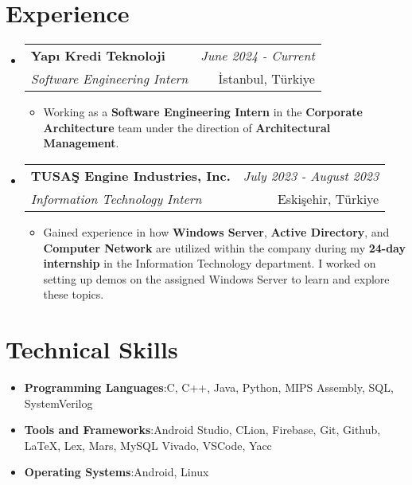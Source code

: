 \documentclass[a4paper,11pt]{article}
\makeatletter
\newcommand{\resumeItem}[2]{
    \item{\textbf{#1}{:\hspace{0.5mm}#2 \vspace{-0.5mm}}}
}
\newcommand{\resumeProject}[4]{
\vspace{0.5mm}\item
    \begin{tabular*}{0.98\textwidth}[t]{l@{\extracolsep{\fill}}r}
    \textbf{#1} & \textit{\footnotesize{#3}} \\
    \footnotesize{\textit{#2}} & \footnotesize{#4}\end{tabular*}\vspace{-2.4mm}
}
\newcommand{\resumeSubItem}[2]{\resumeItem{#1}{#2}\vspace{-4pt}}
\newcommand{\resumeSubHeadingListStart}{\begin{itemize}[leftmargin=*,labelsep=0mm]}
\newcommand{\resumeHeadingSkillStart}{\begin{itemize}[leftmargin=*,itemsep=1.7mm, rightmargin=2ex]}
\newcommand{\resumeItemListStart}{\begin{justify}\begin{itemize}[leftmargin=3ex, rightmargin=2ex, noitemsep,labelsep=1.2mm,itemsep=0mm]\small}
\newcommand{\resumeSubHeadingListEnd}{\end{itemize}\vspace{2mm}}
\newcommand{\resumeHeadingSkillEnd}{\end{itemize}\vspace{-2mm}}
\newcommand{\resumeItemListEnd}{\end{itemize}\end{justify}\vspace{-2mm}}
\makeatother
\begin{document}

\section{\textbf{Experience}}
    \resumeSubHeadingListStart
        \resumeProject
            {Yapı Kredi Teknoloji} {Software Engineering Intern}
            {June 2024 - Current} {İstanbul, Türkiye}
                \resumeItemListStart
                    \item {Working as a {\textbf{Software Engineering Intern}} in the {\textbf{Corporate Architecture}} team under the direction of {\textbf{Architectural Management}}.}
                \resumeItemListEnd
        \resumeProject
            {TUSAŞ Engine Industries, Inc.} {Information Technology Intern}
            {July 2023 - August 2023} {Eskişehir, Türkiye}
                \resumeItemListStart
                    \item {Gained experience in how {\textbf{Windows Server}}, {\textbf{Active Directory}}, and {\textbf{Computer Network}} are utilized within the company during my {\textbf{24-day internship}} in the Information Technology department. I worked on setting up demos on the assigned Windows Server to learn and explore these topics.}
                \resumeItemListEnd
    \resumeSubHeadingListEnd
\vspace{-6.5mm}


\section{\textbf{Technical Skills}}
\vspace{1mm}
    \resumeHeadingSkillStart
        \resumeSubItem{Programming Languages}
            {C, C++, Java, Python, MIPS Assembly, SQL, SystemVerilog}
        \resumeSubItem{Tools and Frameworks}
            {Android Studio, CLion, Firebase, Git, Github, LaTeX, Lex, Mars, MySQL Vivado, VSCode, Yacc}
        \resumeSubItem{Operating Systems}
            {Android, Linux}
    \resumeHeadingSkillEnd
\vspace{-1mm}

\end{document}
